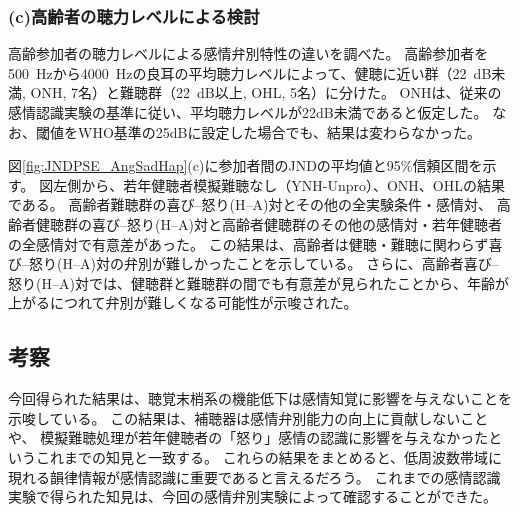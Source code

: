 \subsubsection{(c)高齢者の聴力レベルによる検討}
高齢参加者の聴力レベルによる感情弁別特性の違いを調べた。
高齢参加者を500~Hzから4000~Hzの良耳の平均聴力レベルによって、健聴に近い群（22~dB未満, ONH, 7名）と難聴群（22~dB以上, OHL, 5名）に分けた。
ONHは、従来の感情認識実験\cite{christensen2019effects}の基準に従い、平均聴力レベルが22dB未満であると仮定した。
なお、閾値をWHO基準の25dBに設定した場合でも、結果は変わらなかった。

図\ref{fig:JNDPSE_AngSadHap}(c)に参加者間のJNDの平均値と95\%信頼区間を示す。
図左側から、若年健聴者模擬難聴なし（YNH-Unpro）、ONH、OHLの結果である。
高齢者難聴群の喜び--怒り(H--A)対とその他の全実験条件・感情対、
高齢者健聴群の喜び--怒り(H--A)対と高齢者健聴群のその他の感情対・若年健聴者の全感情対で有意差があった。
この結果は、高齢者は健聴・難聴に関わらず喜び--怒り(H--A)対の弁別が難しかったことを示している。
さらに、高齢者喜び--怒り(H--A)対では、健聴群と難聴群の間でも有意差が見られたことから、年齢が上がるにつれて弁別が難しくなる可能性が示唆された。







\subsection{考察}
今回得られた結果は、聴覚末梢系の機能低下は感情知覚に影響を与えないことを示唆している。
この結果は、補聴器は感情弁別能力の向上に貢献しないこと\cite{goy2018hearing} や、
模擬難聴処理が若年健聴者の「怒り」感情の認識に影響を与えなかった\cite{morgan2022perceived}というこれまでの知見と一致する。
これらの結果をまとめると、低周波数帯域に現れる韻律情報が感情認識に重要であると言えるだろう\cite{orbelo2005impaired,ben2019age}。
これまでの感情認識実験で得られた知見は、今回の感情弁別実験によって確認することができた。

